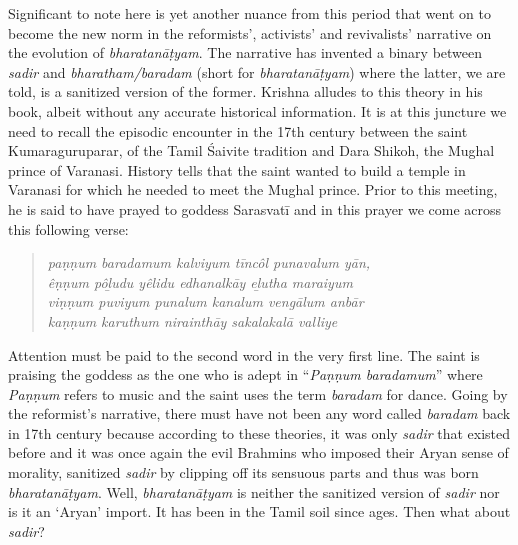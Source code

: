Significant to note here is yet another nuance from this period that went on to become the new norm in the reformists’, activists’ and revivalists’ narrative on the evolution of \textit{bharatanāṭyam}. The narrative has invented a binary between \textit{sadir} and \textit{bharatham/baradam }(short for\textit{ bharatanāṭyam}) where the latter, we are told, is a sanitized version of the former. Krishna alludes to this theory in his book, albeit without any accurate historical information. It is at this juncture we need to recall the episodic encounter in the 17th century between the saint Kumaraguruparar, of the Tamil Śaivite tradition and Dara Shikoh, the Mughal prince of Varanasi. History tells that the saint wanted to build a temple in Varanasi for which he needed to meet the Mughal prince. Prior to this meeting, he is said to have prayed to goddess Sarasvatī and in this prayer we come across this following verse:

\begin{verse}
\textit{paṇṇum baradamum kalviyum tīncôl punavalum yān,}\\\textit{êṇṇum pôḻudu yêlidu edhanalkāy eḻutha maraiyum}\\\textit{viṇṇum puviyum punalum kanalum vengālum anbār}\\\textit{kaṇṇum karuthum nirainthāy sakalakalā valliye}
\end{verse}

\begin{verse}
\end{verse}

Attention must be paid to the second word in the very first line. The saint is praising the goddess as the one who is adept in “\textit{Paṇṇum baradamum}” where \textit{Paṇṇum} refers to music and the saint uses the term \textit{baradam} for dance. Going by the reformist’s narrative, there must have not been any word called \textit{baradam} back in 17th century because according to these theories, it was only \textit{sadir} that existed before and it was once again the evil Brahmins who imposed their Aryan sense of morality, sanitized \textit{sadir} by clipping off its sensuous parts and thus was born \textit{bharatanāṭyam}. Well, \textit{bharatanāṭyam} is neither the sanitized version of \textit{sadir} nor is it an ‘Aryan’ import. It has been in the Tamil soil since ages. Then what about \textit{sadir}?

